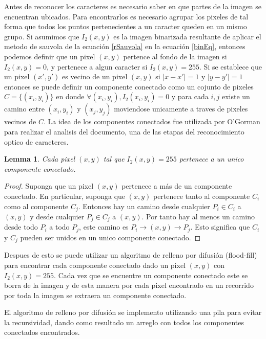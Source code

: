 \documentclass[a4paper, 11pt, oneside]{report}
\begin{document}
Antes de reconocer los caracteres es necesario saber en que partes de la imagen se encuentran ubicados. Para encontrarlos es necesario agrupar los pixeles de tal forma que todos los puntos pertenecientes a un caracter queden en un mismo grupo. Si asumimos que $I_2(x,y)$ es la imagen binarizada resultante de aplicar el metodo de sauvola de la ecuación \eqref{rSauvola} en la ecuación \eqref{binEq}, entonces podemos definir que un pixel $(x,y)$ pertence al fondo de la imagen si $I_2(x,y)=0$, y pertenece a algun caracter si $I_2(x,y)=255$. Si se establece que un pixel $(x',y')$ es vecino de un pixel $(x,y)$ si $|x-x'|=1$ y $|y-y'|=1$ entonces se puede definir un componente conectado como un cojunto de pixeles $C=\{(x_i,y_i)\}$ en donde $\forall{(x_i,y_i)}, I_2(x_i,y_i)=0$ y para cada $i,j$ existe un camino entre $(x_i,y_i)$ y $(x_j,y_j)$ moviendose unicamente a traves de pixeles vecinos de $C$. La idea de los componentes conectados fue utilizada por O'Gorman \cite{docstrum93} para realizar el analisis del documento, una de las etapas del reconocimiento optico de caracteres.

\newtheorem{pixHasOneC}{Lemma}
\begin{pixHasOneC}
	Cada pixel $(x,y)$ tal que $I_2(x,y)=255$ pertenece a un unico componente conectado.
\end{pixHasOneC}
\begin{proof}
	Suponga que un pixel $(x,y)$ pertenece a más de un componente conectado. En particular, suponga que $(x,y)$ pertenece tanto al componente $C_i$ como al componente $C_j$. Entonces hay un camino desde cualquier $P_i \in C_i$ a $(x,y)$ y desde cualquier $P_j \in C_j$ a $(x,y)$. Por tanto hay al menos un camino desde todo $P_i$ a todo $P_j$, este camino es $P_i \rightarrow (x,y) \rightarrow P_j$. Esto significa que $C_i$ y $C_j$ pueden ser unidos en un unico componente conectado.
\end{proof}

Despues de esto se puede utilizar un algoritmo de relleno por difusión (flood-fill) para encontrar cada componente conectado dado un pixel $(x,y)$ con $I_2(x,y)=255$. Cada vez que se encuentre un componente conectado este se borra de la imagen y de esta manera por cada pixel encontrado en un recorrido por toda la imagen se extraera un componente conectado.

El algoritmo de relleno por difusión se implemento utilizando una pila para evitar la recursividad, dando como resultado un arreglo con todos los componentes conectados encontrados.
\end{document}
